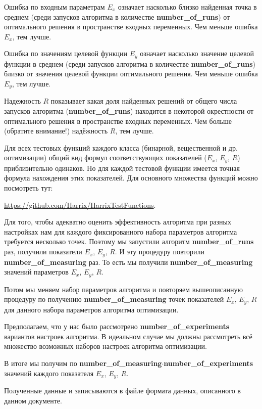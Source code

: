 \documentclass[a4paper,12pt]{article}
\begin{document}
Ошибка по входным параметрам $ E_x $ означает насколько близко найденная точка  в среднем (среди запусков алгоритма в количестве \textbf{number\_of\_runs}) от оптимального решения в пространстве входных переменных. Чем меньше ошибка $ E_x $, тем лучше.

Ошибка по значениям целевой функции $ E_y $ означает насколько значение целевой функции в среднем (среди запусков алгоритма в количестве \textbf{number\_of\_runs}) близко от значения целевой функции оптимального решения. Чем меньше ошибка $ E_y $, тем лучше.

Надежность $ R $ показывает какая доля найденных решений от общего числа запусков алгоритма (\textbf{number\_of\_runs}) находится в некоторой окрестности от оптимального решения в пространстве входных переменных. Чем больше (обратите внимание!) надёжность $ R $, тем лучше.

Для всех тестовых функций каждого класса (бинарной, вещественной и др. оптимизации) общий вид формул соответствующих показателей ($ E_x $, $ E_y $, $ R $) приблизительно одинаков. Но для каждой тестовой функции имеется точная формула нахождения этих показателей. Для основного множества функций можно посмотреть тут:

\href {https://github.com/Harrix/HarrixTestFunctions} {https://github.com/Harrix/HarrixTestFunctions}.

Для того, чтобы адекватно оценить эффективность алгоритма при разных настройках нам для каждого фиксированного набора параметров алгоритма требуется несколько точек. Поэтому мы запустили алгоритм \textbf{number\_of\_runs} раз, получили показатели $ E_x $, $ E_y $, $ R $. И эту процедуру повторили \textbf{number\_of\_measuring} раз. То есть мы получили \textbf{number\_of\_measuring} значений параметров $ E_x $, $ E_y $, $ R $.

Потом мы меняем набор параметров алгоритма и повторяем вышеописанную процедуру по получению \textbf{number\_of\_measuring} точек показателей $ E_x $, $ E_y $, $ R $ для данного набора параметров алгоритма оптимизации.

Предполагаем, что у нас было рассмотрено \textbf{number\_of\_experiments} вариантов настроек алгоритма. В идеальном случае мы должны рассмотреть всё множество возможных наборов настроек алгоритма оптимизации.

В итоге мы получим по \textbf{number\_of\_measuring}$\cdot$\textbf{number\_of\_experiments} значений каждого показателя $ E_x $, $ E_y $, $ R $.

Полученные данные и записываются в файле формата данных, описанного в данном документе.
\end{document}
